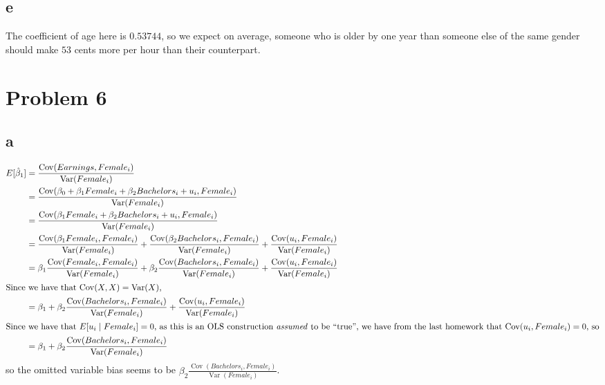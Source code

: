 \documentclass[12pt,letterpaper]{article}
\theoremstyle{definition}
\DeclareMathOperator{\Cov}{Cov}
\DeclareMathOperator{\Var}{Var}
\begin{document}
\subsection*{e}

The coefficient of age here is \(0.53744\), so we expect on average, someone who is older by one year than someone else of the same gender should make \(53\) cents more per hour than their counterpart.

\section*{Problem 6}
\subsection*{a}

\begin{align*}
  E[\hat{\beta}_{1}] &= \frac{\Cov(Earnings, Female_{i})}{\Var(Female_{i})} \\
                     &= \frac{\Cov(\beta_{0} + \beta_{1}Female_{i} + \beta_{2}Bachelors_{i} + u_{i}, Female_{i})}{\Var(Female_{i})} \\
                     &= \frac{\Cov(\beta_{1}Female_{i} + \beta_{2}Bachelors_{i} + u_{i}, Female_{i})}{\Var(Female_{i})} \\
                     &= \frac{\Cov(\beta_{1}Female_{i},Female_{i})}{\Var(Female_{i})} + \frac{\Cov(\beta_{2}Bachelors_{i},Female_{i})}{\Var(Female_{i})} + \frac{\Cov(u_{i},Female_{i})}{\Var(Female_{i})} \\
                     &= \beta_{1}\frac{\Cov(Female_{i}, Female_{i})}{\Var(Female_{i})} + \beta_{2}\frac{\Cov(Bachelors_{i},Female_{i})}{\Var(Female_{i})} + \frac{\Cov(u_{i},Female_{i})}{\Var(Female_{i})} \\
  \intertext{Since we have that \(\Cov(X,X) = \Var(X)\),}
                     &= \beta_{1} + \beta_{2}\frac{\Cov(Bachelors_{i},Female_{i})}{\Var(Female_{i})} + \frac{\Cov(u_{i},Female_{i})}{\Var(Female_{i})} \\
  \intertext{Since we have that \(E[u_{i} \mid Female_{i}] = 0\), as this is an OLS construction \textit{assumed} to be ``true'', we have from the last homework that \(\Cov(u_{i}, Female_{i}) = 0\), so}
                     &= \beta_{1} + \beta_{2}\frac{\Cov(Bachelors_{i},Female_{i})}{\Var(Female_{i})}
\end{align*}
so the omitted variable bias seems to be \(\beta_{2}\frac{\Cov(Bachelors_{i},Female_{i})}{\Var(Female_{i})}\).
\end{document}
